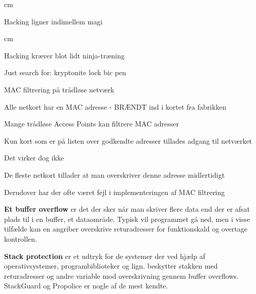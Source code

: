 \documentclass[20pt,landscape,a4paper,footrule]{foils}
\begin{document}
 cm

\centerline{Hacking ligner indimellem  magi}




 cm
\centerline{Hacking kræver blot lidt ninja-træning}





\begin{list1}
\item Just search for: kryptonite lock bic pen
\item {}
\end{list1}





\begin{list1}
\item MAC filtrering på trådløse netværk
\item Alle netkort har en MAC adresse - BRÆNDT ind i kortet fra fabrikken
\item Mange trådløse Access Points kan filtrere MAC adresser
\item Kun kort som er på listen over godkendte adresser tillades adgang til netværket
\pause
\item Det virker dog ikke \smiley
\item De fleste netkort tillader at man overskriver denne adresse midlertidigt
\item Derudover har der ofte været fejl i implementeringen af MAC filtrering
\end{list1}






\begin{list1}
\item {\bfseries Et buffer overflow}
er det der sker når man skriver flere data end der er afsat plads til
i en buffer, et dataområde. Typisk vil programmet gå ned, men i visse
tilfælde kan en angriber overskrive returadresser for funktionskald og
overtage kontrollen.
\item {\bfseries Stack protection}
er et udtryk for de systemer der ved hjælp af operativsystemer,
programbiblioteker og lign. beskytter stakken med returadresser og
andre variable mod overskrivning gennem buffer overflows. StackGuard
og Propolice er nogle af de mest kendte.
\end{list1}
\end{document}
